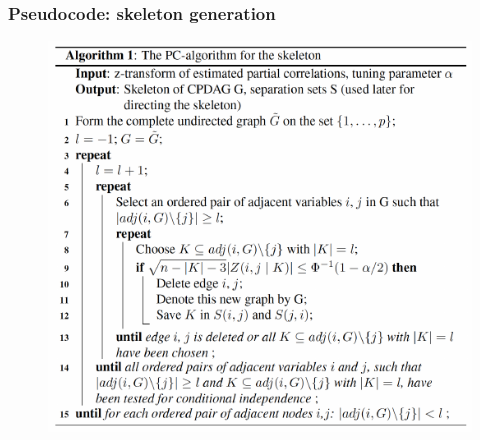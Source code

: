 \documentclass[xcolor ={table,usenames,dvipsnames}]{beamer}
\theoremstyle{definition}
\begin{document}
	\begin{frame}
		\frametitle{Pseudocode: skeleton generation}
		\begin{figure}[h!]
			\centering
			\includegraphics[scale=0.53]{img/pcalg.PNG}
			\label{Interfacce di un CS}
		\end{figure}
	\end{frame}


	
\end{document}
